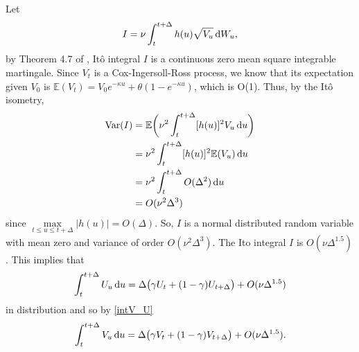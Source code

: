 \documentclass{ws-ijfe}
\begin{document}
Let $$I =\nu\int_{t}^{t+\Delta}h(u)\sqrt{V_u}\,\mathrm{d} W_u,$$
by Theorem 4.7 of \cite{Klebaner2005}, It\^o integral $I$ is a continuous zero mean square integrable martingale.  Since $V_t$ is a Cox-Ingersoll-Ross process, we know that its expectation given $V_0$ is $\mathbb{E}(V_t)=V_0 e^{-\kappa u}+\theta(1-e^{-\kappa u})$\cite{Dufresne2001}, which is O(1). Thus, by the It\^o isometry,
\begin{align*}
  \text{Var}(I)%
  &= \mathbb{E}\bigg(\nu^2 \int_{t}^{t+\Delta}[h(u)]^2 V_u\,\d u\bigg)\\
  &=\nu^2\int_{t}^{t+\Delta}[h(u)]^2 \mathbb{E}(V_u)\,\d u\\
&=\nu^2\int_{t}^{t+\Delta}O(\Delta^2)\,\d u\\
&=O(\nu^2\Delta^3)
\end{align*}
since $\max\limits_{t\leq u\leq t+\Delta}|h(u)|=O(\Delta)$.
So, $I$ is a normal distributed random variable with mean zero and variance of order $O(\nu^2\Delta^{3})$. The Ito integral $I$ is $O(\nu\Delta^{1.5})$.
This implies that
\begin{equation*}
   \int_{t}^{t+\Delta}U_u\,\mathrm{d} u = \Delta\big(\gamma U_t+(1-\gamma) U_{t+\Delta}\big)+O(\nu\Delta^{1.5})
\end{equation*}
in distribution and so by \eqref{intV_U}
\begin{equation*}
    \int_{t}^{t+\Delta}V_u\,\mathrm{d} u=\Delta\big(\gamma V_t+(1-\gamma) V_{t+\Delta}\big)+O(\nu\Delta^{1.5}).
\end{equation*}
\end{document}
